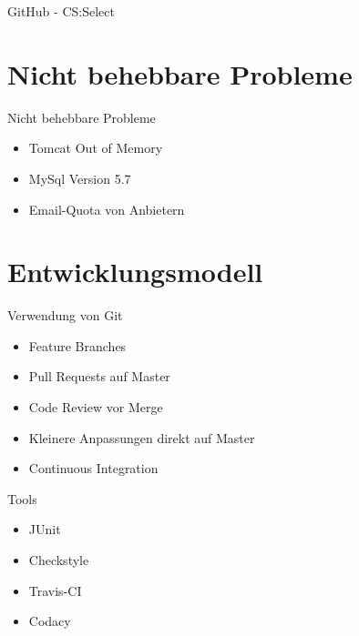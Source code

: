 \documentclass[xcolor=dvipsnames]{beamer}
\begin{document}
\begin{frame}{GitHub - CS:Select}
    \begin{itemize}
        \vspace{10pt}
    \end{itemize}
\end{frame}

\section{Nicht behebbare Probleme}
\begin{frame}{Nicht behebbare Probleme}
\begin{itemize}
    \item Tomcat Out of Memory
    \item MySql Version 5.7
    \item Email-Quota von Anbietern
\end{itemize}
\end{frame}

\section{Entwicklungsmodell}
\begin{frame}{Verwendung von Git}
    \begin{itemize}
        \item Feature Branches
        \item Pull Requests auf Master
        \item Code Review vor Merge
        \item Kleinere Anpassungen direkt auf Master
        \item Continuous Integration
    \end{itemize}
\end{frame}

\begin{frame}{Tools}
    \begin{itemize}
        \item JUnit
        \item Checkstyle
        \item Travis-CI
        \item Codacy
    \end{itemize}
\end{frame}
\end{document}
